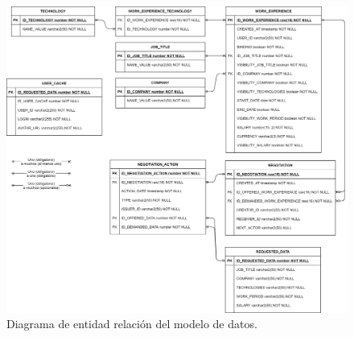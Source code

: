 \documentclass[a4paper, 12pt]{book}
\begin{document}
\begin{figure}
  \centering
  \includegraphics[width=15cm, keepaspectratio]{img/Modelo_datos.png}
  \caption{Diagrama de entidad relación del modelo de datos.}\label{fig:data_model}
\end{figure}
\end{document}
